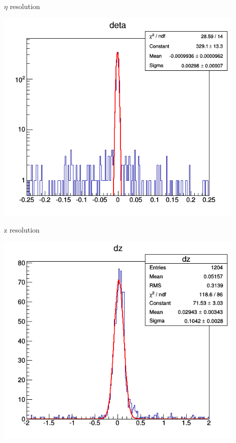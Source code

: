\documentclass[10pt]{beamer}
\begin{document}
\begin{frame}{$\eta$ resolution}
	\centerline{\includegraphics[width=0.9\textwidth,height=0.9\textheight]{deta_acu.png}}

\end{frame}
\begin{frame}{z resolution}
	\centerline{\includegraphics[width=0.9\textwidth,height=0.9\textheight]{dz_acu.png}}

\end{frame}
\end{document}
